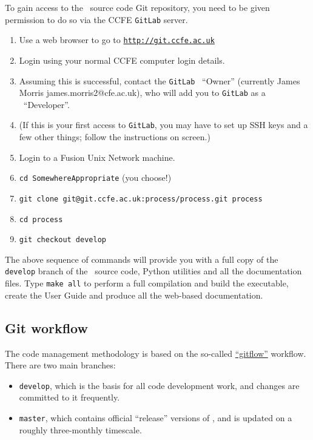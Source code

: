 To gain access to the \process\ source code Git repository, you need
to be given permission to do so via the CCFE \texttt{GitLab} server.
\begin{enumerate}

\item Use a web browser to go to
  \href{http://git.ccfe.ac.uk}{\texttt{http://git.ccfe.ac.uk}}

\item Login using your normal CCFE computer login details.

\item Assuming this is successful, contact the \texttt{GitLab} \process\
  ``Owner'' (currently James Morris james.morris2@cfe.ac.uk), who will add you to \texttt{GitLab} as a \process\ ``Developer''.

\item (If this is your first access to \texttt{GitLab}, you may have to set up
  SSH keys and a few other things; follow the instructions on screen.)

\item Login to a Fusion Unix Network machine.

\item \texttt{cd SomewhereAppropriate} (you choose!)

\item \texttt{git clone git@git.ccfe.ac.uk:process/process.git process}

\item \texttt{cd process}

\item \texttt{git checkout develop}

\end{enumerate}

The above sequence of commands will provide you with a full copy of the
\texttt{develop} branch of the \process\ source code, Python utilities and all
the documentation files. Type \texttt{make all} to perform a full compilation
and build the executable, create the User Guide and produce all the web-based
documentation.

\subsection{Git workflow}

The code management methodology is based on the so-called
\href{https://www.atlassian.com/git/workflows#!workflow-gitflow}{``gitflow''}
workflow. There are two main branches:
\begin{itemize}

\item \texttt{develop}, which is the basis for all code development work, and
  changes are committed to it frequently.

\item \texttt{master}, which contains official ``release'' versions of
  \process, and is updated on a roughly three-monthly timescale.

\end{itemize}

